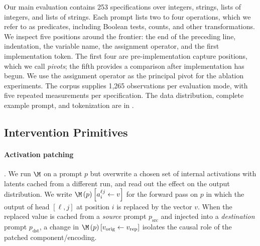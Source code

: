 Our main evaluation contains 253 specifications over integers, strings, lists of integers, and lists of strings. Each prompt lists two to four operations, which we refer to as predicates, including Boolean tests, counts, and other transformations. We inspect five positions around the frontier: the end of the preceding line, indentation, the variable name, the assignment operator, and the first implementation token. The first four are pre-implementation capture positions, which we call \emph{pivots}; the fifth provides a comparison after implementation has begun. We use the assignment operator as the principal pivot for the ablation experiments. The corpus supplies 1,265 observations per evaluation mode, with five repeated measurements per specification. The data distribution, complete example prompt, and tokenization are in . 


\subsection{Intervention Primitives}
\label{sec:notations:interventions}
\paragraph{Activation patching} \citep{vig-etal-2020, mueller2026quest}. We run $\M$ on a prompt $p$ but overwrite a chosen set of internal activations with latents cached from a different run, and read out the effect on the output distribution. We write $\M\left(p\right)\left[a_i^{\ell j} \leftarrow v\right]$ for the forward pass on $p$ in which the output of head $[\ell,j]$ at position $i$ is replaced by the vector $v$. When the replaced value is cached from a \emph{source} prompt $p_{\text{src}}$ and injected into a \emph{destination} prompt $p_{\text{dst}}$, a change in $\M\left(p\right)\left[v_\mathrm{orig} \leftarrow v_\mathrm{rep}\right]$ isolates the causal role of the patched component/encoding. 

